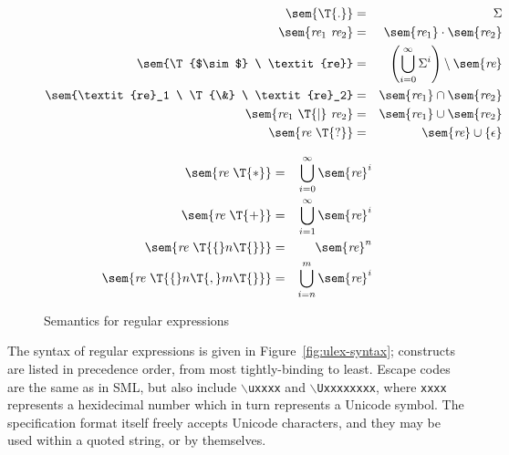 \newcommand{\REX}{\textit{re}}
\begin{figure}
\begin{minipage}[t]{.5\textwidth}
\begin{eqnarray*}
  \sem{\T{.}} &=& \Sigma \\
  \sem{\REX_1 \ \REX_2} &=& \sem{\REX_1} \cdot \sem{\REX_2} \\
  \sem{\T{$\sim$} \ \REX} &=& \left(\bigcup_{i=0}^\infty \Sigma^i\right)\setminus \sem{\REX} \\
  \sem{\REX_1 \ \T{\&} \ \REX_2} &=& \sem{\REX_1} \cap \sem{\REX_2} \\
  \sem{\REX_1 \ \T{|} \ \REX_2} &=& \sem{\REX_1} \cup \sem{\REX_2} \\
  \sem{\REX \ \T{?}} &=& \sem{\REX} \cup \{ \epsilon \}
\end{eqnarray*}
\end{minipage}\begin{minipage}[t]{.5\textwidth}
\begin{eqnarray*}
  \sem{\REX \ \T{*}} &=& \bigcup_{i=0}^\infty \sem{\REX}^i \\
  \sem{\REX \ \T{+}} &=& \bigcup_{i=1}^\infty \sem{\REX}^i \\
  \sem{\REX \ \T{\{} n \T{\}}} &=& \sem{\REX}^n \\
  \sem{\REX \ \T{\{} n \T{, } m \T{\}}} &=& \bigcup_{i=n}^m \sem{\REX}^i
\end{eqnarray*}
\end{minipage}
\caption{Semantics for regular expressions}\label{ulex-re-semantics}
\end{figure}

The syntax of regular expressions is given in Figure~\ref{fig:ulex-syntax}; constructs are listed in precedence order, from most tightly-binding to least.  Escape codes are the same as in SML, but also include \texttt{$\backslash$uxxxx} and \texttt{$\backslash$Uxxxxxxxx}, where \texttt{xxxx} represents a hexidecimal number which in turn represents a Unicode symbol.  The specification format itself freely accepts Unicode characters, and they may be used within a quoted string, or by themselves.

